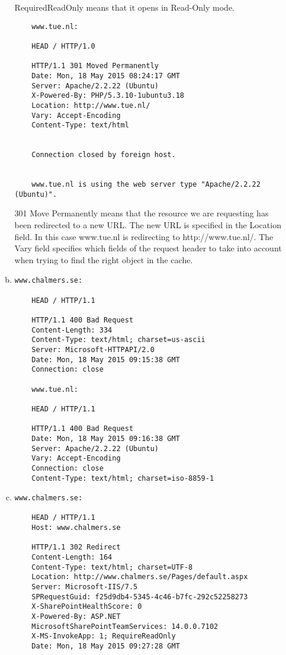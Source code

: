 \documentclass[a4paper,9pt,fleqn]{article}
\begin{document}
\begin{enumerate}[{Task} 1]
\begin{enumerate}[a)]
RequiredReadOnly means that it opens in Read-Only mode.

\begin{lstlisting}
	www.tue.nl:

	HEAD / HTTP/1.0

	HTTP/1.1 301 Moved Permanently
	Date: Mon, 18 May 2015 08:24:17 GMT
	Server: Apache/2.2.22 (Ubuntu)
	X-Powered-By: PHP/5.3.10-1ubuntu3.18
	Location: http://www.tue.nl/
	Vary: Accept-Encoding
	Content-Type: text/html


	Connection closed by foreign host.


	www.tue.nl is using the web server type "Apache/2.2.22 (Ubuntu)".
\end{lstlisting}

301 Move Permanently means that the resource we are requesting has been redirected
to a new URL. The new URL is specified in the Location field. In this case www.tue.nl
is redirecting to http://www.tue.nl/. The Vary field specifies which fields of the
request header to take into account when trying to find the right object in the cache.

\item 
\begin{lstlisting}
www.chalmers.se:

	HEAD / HTTP/1.1

	HTTP/1.1 400 Bad Request
	Content-Length: 334
	Content-Type: text/html; charset=us-ascii
	Server: Microsoft-HTTPAPI/2.0
	Date: Mon, 18 May 2015 09:15:38 GMT
	Connection: close

	www.tue.nl:

	HEAD / HTTP/1.1

	HTTP/1.1 400 Bad Request
	Date: Mon, 18 May 2015 09:16:38 GMT
	Server: Apache/2.2.22 (Ubuntu)
	Vary: Accept-Encoding
	Connection: close
	Content-Type: text/html; charset=iso-8859-1
\end{lstlisting}
\item 
\begin{lstlisting}
www.chalmers.se:

	HEAD / HTTP/1.1
	Host: www.chalmers.se

	HTTP/1.1 302 Redirect
	Content-Length: 164
	Content-Type: text/html; charset=UTF-8
	Location: http://www.chalmers.se/Pages/default.aspx
	Server: Microsoft-IIS/7.5
	SPRequestGuid: f25d9db4-5345-4c46-b7fc-292c52258273
	X-SharePointHealthScore: 0
	X-Powered-By: ASP.NET
	MicrosoftSharePointTeamServices: 14.0.0.7102
	X-MS-InvokeApp: 1; RequireReadOnly
	Date: Mon, 18 May 2015 09:27:28 GMT


\end{lstlisting}
\end{enumerate}
\end{enumerate}
\end{document}
